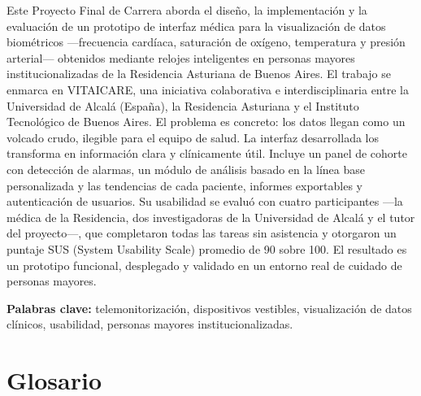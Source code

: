 \documentclass[12pt,a4paper]{article}
\begin{document}
Este Proyecto Final de Carrera aborda el diseño, la implementación y la
evaluación de un prototipo de interfaz médica para la visualización de datos
biométricos —frecuencia cardíaca, saturación de oxígeno, temperatura y presión
arterial— obtenidos mediante relojes inteligentes en personas mayores
institucionalizadas de la Residencia Asturiana de Buenos Aires. El trabajo se
enmarca en VITAICARE, una iniciativa colaborativa e interdisciplinaria entre la
Universidad de Alcalá (España), la Residencia Asturiana y el Instituto
Tecnológico de Buenos Aires. El problema es concreto: los datos llegan como un
volcado crudo, ilegible para el equipo de salud. La interfaz desarrollada los
transforma en información clara y clínicamente útil. Incluye un panel de cohorte con
detección de alarmas, un módulo de análisis basado en la línea base personalizada
y las tendencias de cada paciente, informes exportables y autenticación de
usuarios. Su usabilidad se evaluó con cuatro participantes —la médica de la
Residencia, dos investigadoras de la Universidad de Alcalá y el tutor del
proyecto—, que completaron todas las tareas sin asistencia y otorgaron un puntaje
SUS (System Usability Scale) promedio de 90 sobre 100. El resultado es un prototipo funcional, desplegado
y validado en un entorno real de cuidado de personas mayores.

\medskip
\noindent\textbf{Palabras clave:} telemonitorización, dispositivos vestibles,
visualización de datos clínicos, usabilidad, personas mayores institucionalizadas.

\clearpage

\tableofcontents
\clearpage

\section*{Glosario}
\end{document}
